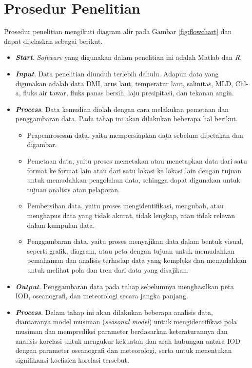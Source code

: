\section[Prosedur Penelitian]{Prosedur Penelitian}
\begin{spacing}{1.5}
	Prosedur penelitian mengikuti diagram alir pada Gambar \ref{fig:flowchart} dan dapat dijelaskan sebagai berikut. 
	\begin{itemize}
		\item \textbf{\textit{Start}}. \textit{Software} yang digunakan dalam penelitian ini adalah Matlab dan \textit{R}.
		\item \textbf{\textit{Input}}. Data penelitian diunduh terlebih dahulu. Adapun data yang digunakan adalah data DMI, arus laut, temperatur laut, salinitas, MLD, Chl-a, fluks air tawar, fluks panas bersih, laju presipitasi, dan tekanan angin.
		\item \textbf{\textit{Process}}. Data kemudian diolah dengan cara melakukan pemetaan dan penggambaran data. Pada tahap ini akan dilakukan beberapa hal berikut.
		\begin{itemize}
			\item Prapemrosesan data, yaitu mempersiapkan data sebelum dipetakan dan digambar.
			\item Pemetaan data, yaitu proses memetakan atau menetapkan data dari satu format ke format lain atau dari satu lokasi ke lokasi lain dengan tujuan untuk memudahkan pengolahan data, sehingga dapat digunakan untuk tujuan analisis atau pelaporan.
			\item Pembersihan data, yaitu proses mengidentifikasi, mengubah, atau menghapus data yang tidak akurat, tidak lengkap, atau tidak relevan dalam kumpulan data. 
			\item Penggambaran data, yaitu proses menyajikan data dalam bentuk visual, seperti grafik, diagram, atau peta dengan tujuan untuk memudahkan pemahaman dan analisis terhadap data yang kompleks dan memudahkan untuk melihat pola dan tren dari data yang disajikan.
		\end{itemize}
		
		\item \textbf{\textit{Output}}. Penggambaran data pada tahap sebelumnya menghasilkan peta IOD, oseanografi, dan meteorologi secara jangka panjang. 
		\item \textbf{\textit{Process}}. Dalam tahap ini akan dilakukan beberapa analisis data, diantaranya model musiman (\textit{seasonal model}) untuk mengidentifikasi pola musiman dan memprediksi parameter berdasarkan keteraturannya dan analisis korelasi untuk mengukur kekuatan dan arah hubungan antara IOD dengan parameter oseanografi dan meteorologi, serta untuk menentukan signifikansi koefisien korelasi tersebut.
		

\end{itemize}
\end{spacing}
